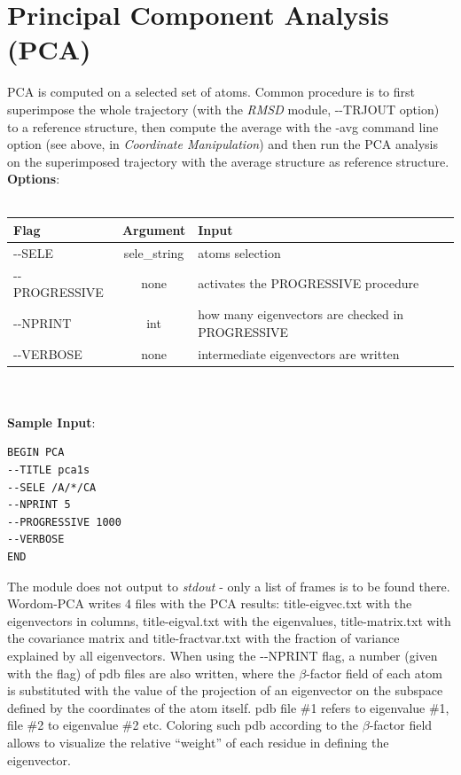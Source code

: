 \documentclass[11pt,twoside,onecolumn,a4paper,openright,notitlepage]{book}[2001/04/21]
\begin{document}
\section{Principal Component Analysis (PCA)}
PCA is computed on a selected set of atoms. Common procedure is to first superimpose the whole trajectory (with the \emph{RMSD} module, -{}-TRJOUT option) to a reference structure, then compute the average with the -avg command line option (see above, in \emph{Coordinate Manipulation}) and then run the PCA analysis on the superimposed trajectory with the average structure as reference structure.\\

\textbf{\large Options}:\\\\
\begin{tabular}{l|c|p{8.0cm}}
Flag & Argument & Input \\
\hline
-{}-SELE          & sele\_string  & atoms selection\\
-{}-PROGRESSIVE   & none  & activates the PROGRESSIVE procedure\\
-{}-NPRINT        & int   & how many eigenvectors are checked in PROGRESSIVE\\
-{}-VERBOSE       & none  & intermediate eigenvectors are written\\
\end{tabular}\\\\

\textbf{\large Sample Input}:
\begin{verbatim}
BEGIN PCA
--TITLE pca1s
--SELE /A/*/CA
--NPRINT 5
--PROGRESSIVE 1000
--VERBOSE
END
\end{verbatim}

The module does not output to \emph{stdout} - only a list of frames is to be found there. Wordom-PCA writes 4 files with the PCA results: title-eigvec.txt with the eigenvectors in columns, title-eigval.txt with the eigenvalues, title-matrix.txt with the covariance matrix and title-fractvar.txt with the fraction of variance explained by all eigenvectors. When using the -{}-NPRINT flag, a number (given with the flag) of pdb files are also written, where the $\beta{}$-factor field of each atom is substituted with the value of the projection of an eigenvector on the subspace defined by the coordinates of the atom itself. pdb file \#1 refers to eigenvalue \#1, file \#2 to eigenvalue \#2 etc. Coloring such pdb according to the $\beta{}$-factor field allows to visualize the relative ``weight'' of each residue in defining the eigenvector.
\end{document}
